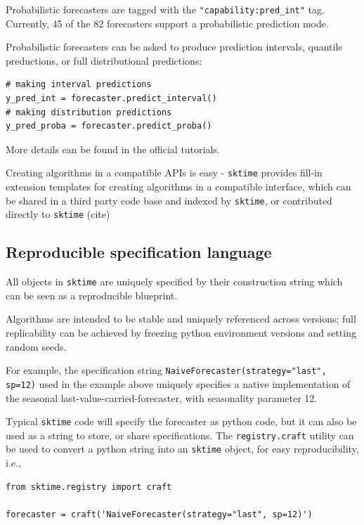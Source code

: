 Probabilistic forecasters are tagged with the \texttt{"capability:pred\_int"} tag.
Currently, 45 of the 82 forecasters support a probabilistic prediction mode.

Probabilistic forecasters can be asked to produce prediction intervals, quantile preductions, or full distributional predictions:

\begin{verbatim}
# making interval predictions
y_pred_int = forecaster.predict_interval()
# making distribution predictions
y_pred_proba = forecaster.predict_proba()
\end{verbatim}

More details can be found in the official tutorials.

Creating algorithms in a compatible APIs is easy - \texttt{sktime} provides fill-in extension templates for creating algorithms in a compatible interface, which can be shared in a third party code base and indexed by \texttt{sktime}, or contributed directly to \texttt{sktime} (cite)

\subsection{Reproducible specification language}

All objects in \texttt{sktime} are uniquely specified by their construction string which can be seen as a reproducible blueprint.

Algorithms are intended to be stable and uniquely referenced across versions; full replicability can be achieved by freezing python environment versions and setting random seeds.

For example, the specification string 
\texttt{NaiveForecaster(strategy="last", sp=12)}
used in the example above uniquely specifies a native implementation of the seasonal last-value-carried-forecaster, with seasonality parameter 12.

Typical \texttt{sktime} code will specify the forecaster as python code, but it can also be used as a string to store, or share specifications.
The \texttt{registry.craft} utility can be used to convert a python string into an \texttt{sktime} object, for easy reproducibility, i.e.,

\begin{verbatim}
from sktime.registry import craft

forecaster = craft('NaiveForecaster(strategy="last", sp=12)')
\end{verbatim}

